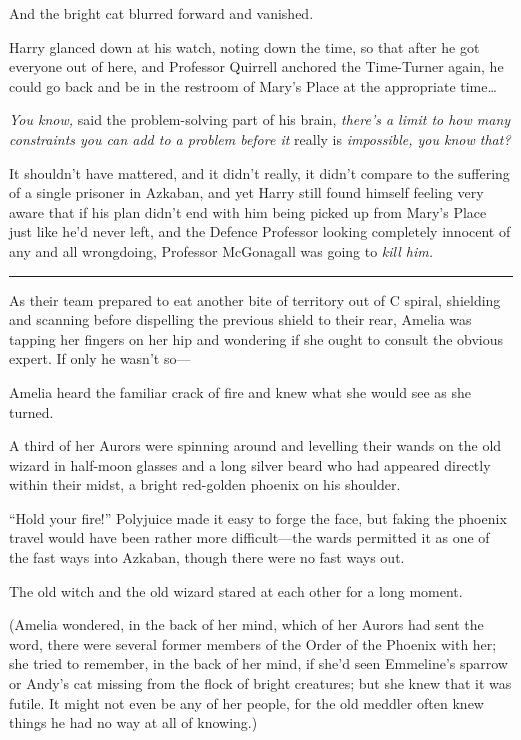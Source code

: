 And the bright cat blurred forward and vanished.

Harry glanced down at his watch, noting down the time, so that after he
got everyone out of here, and Professor Quirrell anchored the
Time-Turner again, he could go back and be in the restroom of Mary's
Place at the appropriate time\ldots{}

\emph{You know,} said the problem-solving part of his brain,
\emph{there's a limit to how many constraints you can add to a problem
before it} really is \emph{impossible, you know that?}

It shouldn't have mattered, and it didn't really, it didn't compare to
the suffering of a single prisoner in Azkaban, and yet Harry still found
himself feeling very aware that if his plan didn't end with him being
picked up from Mary's Place just like he'd never left, and the Defence
Professor looking completely innocent of any and all wrongdoing,
Professor McGonagall was going to \emph{kill him.}

\begin{center}\rule{3in}{0.4pt}\end{center}

As their team prepared to eat another bite of territory out of C spiral,
shielding and scanning before dispelling the previous shield to their
rear, Amelia was tapping her fingers on her hip and wondering if she
ought to consult the obvious expert. If only he wasn't so---

Amelia heard the familiar crack of fire and knew what she would see as
she turned.

A third of her Aurors were spinning around and levelling their wands on
the old wizard in half-moon glasses and a long silver beard who had
appeared directly within their midst, a bright red-golden phoenix on his
shoulder.

``Hold your fire!'' Polyjuice made it easy to forge the face, but faking
the phoenix travel would have been rather more difficult---the wards
permitted it as one of the fast ways into Azkaban, though there were no
fast ways out.

The old witch and the old wizard stared at each other for a long moment.

(Amelia wondered, in the back of her mind, which of her Aurors had sent
the word, there were several former members of the Order of the Phoenix
with her; she tried to remember, in the back of her mind, if she'd seen
Emmeline's sparrow or Andy's cat missing from the flock of bright
creatures; but she knew that it was futile. It might not even be any of
her people, for the old meddler often knew things he had no way at all
of knowing.)

